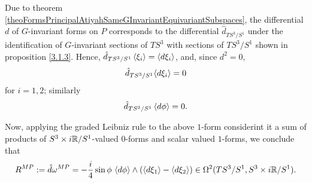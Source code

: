 \begin{example}
\noindent Due to theorem \ref{theoFormsPrincipalAtiyahSameGInvariantEquivariantSubspaces}, the differential $d$ of $G$-invariant forms on $P$ corresponds to the differential $\hat d_{TS^3/S^1}$ under the identification of $G$-invariant sections of $TS^3$ with sections of $TS^3/S^1$ shown in proposition \ref{3.1.3}. Hence, $\hat d_{TS^3/S^1} \left\langle \xi_i \right\rangle = \left\langle d \xi_i \right\rangle$, and, since $d^2 = 0$, 
\begin{equation*}
    \hat d_{TS^3/S^1} {\left\langle d\xi_i \right\rangle} = 0
\end{equation*} for $i = 1, 2$; similarly 
\begin{equation*}
     \hat d_{TS^3/S^1} \cl{d \phi} = 0.
\end{equation*}

\noindent Now, applying the graded Leibniz rule to the above $1$-form considerint it a sum of products of $S^3\times i\mathbb{R}/S^1$-valued $0$-forms and scalar valued $1$-forms, we conclude that
\begin{equation}
    \lbtext{R^{MP}_{}} 
    := \hat d \omega^{MP}_{} = -\frac{i}{4} \sin \phi \, \cl{d\phi} \wedge (\cl{d\xi_1} - \cl{d\xi_2}) 
    \in \Omega^2(TS^3/S^1, S^3 \times i\RR / S^1).
\end{equation}
\end{example}








